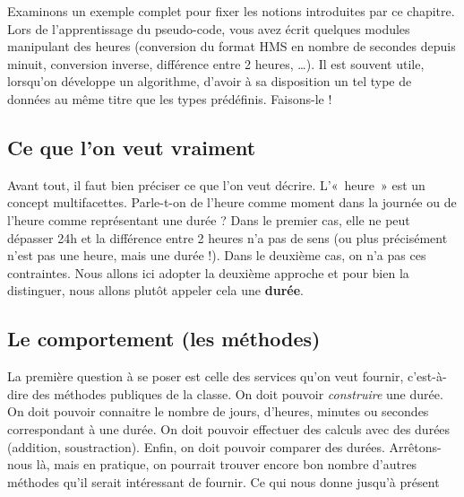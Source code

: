 	Examinons un exemple complet pour fixer les notions introduites par ce
	chapitre. Lors de l'apprentissage du pseudo-code, vous
	avez écrit quelques modules manipulant des heures (conversion du format
	HMS en nombre de secondes depuis minuit, conversion inverse, différence
	entre 2 heures, …). Il est souvent utile, lorsqu’on développe un
	algorithme, d’avoir à sa disposition un tel type de données au même
	titre que les types prédéfinis. Faisons-le !
	
	\subsection{Ce que l’on veut vraiment}
	
		Avant tout, il faut bien préciser ce que l’on veut décrire. L’«~heure~»
		est un concept multifacettes. Parle-t-on de l’heure comme moment dans
		la journée ou de l’heure comme représentant une durée ? Dans le premier
		cas, elle ne peut dépasser 24h et la différence entre 2 heures n’a pas
		de sens (ou plus précisément n’est pas une heure, mais une durée !).
		Dans le deuxième cas, on n’a pas ces contraintes. Nous allons ici
		adopter la deuxième approche et pour bien la distinguer, nous allons
		plutôt appeler cela une \textbf{durée}.
	
	\subsection{Le comportement (les méthodes)}
	
		La première question à se poser est celle des services qu’on veut
		fournir, c’est-à-dire des méthodes publiques de la classe. On doit
		pouvoir \textit{construire} une durée. On doit pouvoir connaitre le
		nombre de jours, d’heures, minutes ou secondes correspondant à une durée. On doit
		pouvoir effectuer des calculs avec des durées (addition, soustraction).
		Enfin, on doit pouvoir comparer des durées. Arrêtons-nous là, mais en
		pratique, on pourrait trouver encore bon nombre d’autres méthodes qu’il
		serait intéressant de fournir. Ce qui nous donne jusqu’à présent
		
